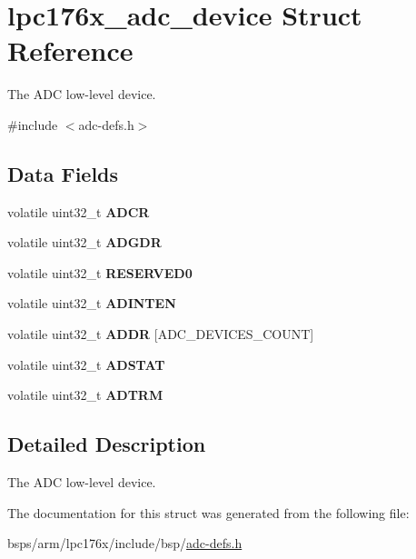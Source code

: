 \hypertarget{structlpc176x__adc__device}{}\section{lpc176x\+\_\+adc\+\_\+device Struct Reference}
\label{structlpc176x__adc__device}


The A\+DC low-\/level device.  




{\ttfamily \#include $<$adc-\/defs.\+h$>$}

\subsection*{Data Fields}
\begin{DoxyCompactItemize}
\item 
\mbox{\label{structlpc176x__adc__device_a4a51915fe62e9ad207d6595a963502f9}} 
volatile uint32\+\_\+t {\bfseries A\+D\+CR}
\item 
\mbox{\label{structlpc176x__adc__device_a32da93e9b9188f8b22ab23423f87ac96}} 
volatile uint32\+\_\+t {\bfseries A\+D\+G\+DR}
\item 
\mbox{\label{structlpc176x__adc__device_a61cc929e6107fe6effb6976260dc6d1c}} 
volatile uint32\+\_\+t {\bfseries R\+E\+S\+E\+R\+V\+E\+D0}
\item 
\mbox{\label{structlpc176x__adc__device_a2d035868ffd418d119ff1b6724fc84aa}} 
volatile uint32\+\_\+t {\bfseries A\+D\+I\+N\+T\+EN}
\item 
\mbox{\label{structlpc176x__adc__device_ae3439a198ba73bba1768094aed47356c}} 
volatile uint32\+\_\+t {\bfseries A\+D\+DR} \mbox{[}A\+D\+C\+\_\+\+D\+E\+V\+I\+C\+E\+S\+\_\+\+C\+O\+U\+NT\mbox{]}
\item 
\mbox{\label{structlpc176x__adc__device_a8f6684b376e603ff49caabf947485324}} 
volatile uint32\+\_\+t {\bfseries A\+D\+S\+T\+AT}
\item 
\mbox{\label{structlpc176x__adc__device_aa9189bb14460d47ec5d0cdd31b1cbd86}} 
volatile uint32\+\_\+t {\bfseries A\+D\+T\+RM}
\end{DoxyCompactItemize}


\subsection{Detailed Description}
The A\+DC low-\/level device. 

The documentation for this struct was generated from the following file\+:\begin{DoxyCompactItemize}
\item 
bsps/arm/lpc176x/include/bsp/\mbox{\hyperlink{adc-defs_8h}{adc-\/defs.\+h}}\end{DoxyCompactItemize}
